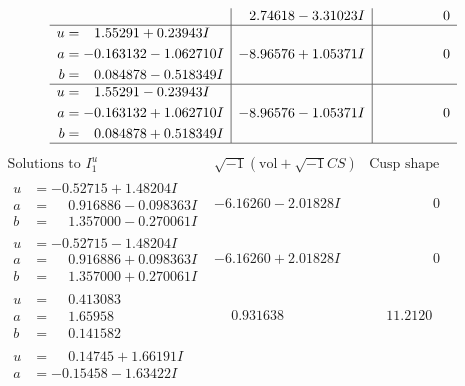\documentclass[1p]{elsarticle_modified}
\theoremstyle{definition}
\newcommand{\I}{\sqrt{-1}}
\begin{document}
$$\begin{array}{c|c|c}
 & \phantom{-}2.74618 - 3.31023 I & \phantom{-0.000000 } 0 \\ \hline\begin{aligned}
u &= \phantom{-}1.55291 + 0.23943 I \\
a &= -0.163132 - 1.062710 I \\
b &= \phantom{-}0.084878 - 0.518349 I\end{aligned}
 & -8.96576 + 1.05371 I & \phantom{-0.000000 } 0 \\ \hline\begin{aligned}
u &= \phantom{-}1.55291 - 0.23943 I \\
a &= -0.163132 + 1.062710 I \\
b &= \phantom{-}0.084878 + 0.518349 I\end{aligned}
 & -8.96576 - 1.05371 I & \phantom{-0.000000 } 0\\
 \hline 
 \end{array}$$\newpage$$\begin{array}{c|c|c}  
\text{Solutions to }I^u_{1}& \I (\text{vol} + \sqrt{-1}CS) & \text{Cusp shape}\\
 \hline 
\begin{aligned}
u &= -0.52715 + 1.48204 I \\
a &= \phantom{-}0.916886 - 0.098363 I \\
b &= \phantom{-}1.357000 - 0.270061 I\end{aligned}
 & -6.16260 - 2.01828 I & \phantom{-0.000000 } 0 \\ \hline\begin{aligned}
u &= -0.52715 - 1.48204 I \\
a &= \phantom{-}0.916886 + 0.098363 I \\
b &= \phantom{-}1.357000 + 0.270061 I\end{aligned}
 & -6.16260 + 2.01828 I & \phantom{-0.000000 } 0 \\ \hline\begin{aligned}
u &= \phantom{-}0.413083\phantom{ +0.000000I} \\
a &= \phantom{-}1.65958\phantom{ +0.000000I} \\
b &= \phantom{-}0.141582\phantom{ +0.000000I}\end{aligned}
 & \phantom{-}0.931638\phantom{ +0.000000I} & \phantom{-}11.2120\phantom{ +0.000000I} \\ \hline\begin{aligned}
u &= \phantom{-}0.14745 + 1.66191 I \\
a &= -0.15458 - 1.63422 I \\

\end{aligned}
\end{array}$$
\end{document}
